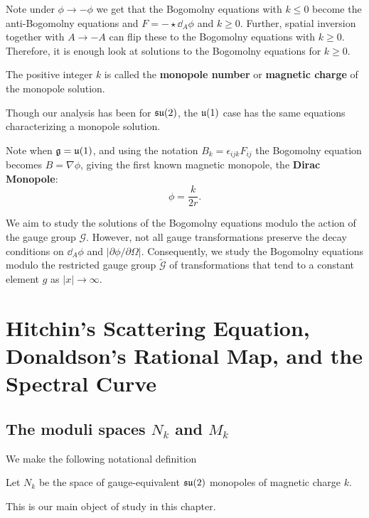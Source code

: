 	Note under $\phi \to -\phi$ we get that the Bogomolny equations with $k \leq 0$ become the anti-Bogomolny equations and $F = -\star \dd_A \phi$ and $k \geq 0$. Further, spatial inversion together with $A\to-A$ can flip these to the Bogomolny equations with $k \geq 0$. Therefore, it is enough look at solutions to the Bogomolny equations for $k \geq 0$.
	
	\begin{defn}
		The positive integer $k$ is called the \textbf{monopole number} or \textbf{magnetic charge} of the monopole solution.
	\end{defn}
	
	Though our analysis has been for $\frak{su}(2)$, the $\frak{u}(1)$ case has the same equations characterizing a monopole solution.
	\begin{obs}
		Note when $\frak g = \frak u(1)$, and using the notation $B_k = \epsilon_{ijk} F_{ij}$ the Bogomolny equation becomes $B = \nabla \phi$, giving the first known magnetic monopole, the \textbf{Dirac Monopole}:
		\begin{equation*}
			\phi = \frac{k}{2r}.
		\end{equation*}
	\end{obs}
	
	\begin{nb}
		We aim to study the solutions of the Bogomolny equations modulo the action of the gauge group $\mathcal G$. However, not all gauge transformations preserve the decay conditions on $\dd_A \phi$ and $|\partial \phi/\partial \Omega|$. Consequently, we study the Bogomolny equations modulo the restricted gauge group $\tilde{\mathcal G}$ of transformations that tend to a constant element $g$ as $|x| \to \infty$.
	\end{nb}
	
	
	\section{Hitchin's Scattering Equation, Donaldson's Rational Map, and the Spectral Curve}
	
	\subsection{The moduli spaces $N_k$ and $M_k$} %
	\label{sub:the_moduli_spaces_n_k_and_m_k}

	
	We make the following notational definition
	\begin{defn}
		Let $N_k$ be the space of gauge-equivalent $\frak{su}(2)$ monopoles of magnetic charge $k$.
	\end{defn}
	This is our main object of study in this chapter.
	
